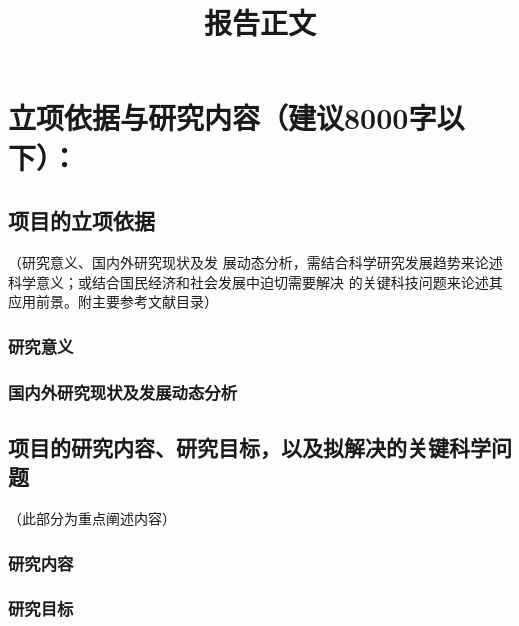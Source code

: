 \documentclass[a4paper,12pt, AutoFakeBold, fontset=adobe]{ctexart}
\title{\bfseries\kaishu\zihao{3} 报告正文}
\author{\vspace{-2cm}}
\date{\vspace{-2cm}}
\begin{document}
\maketitle

\section{立项依据与研究内容（建议8000字以下）：}

\subsection{项目的立项依据}{\color{nsfcblue}\kaishu\noindent（研究意义、国内外研究现状及发
  展动态分析，需结合科学研究发展趋势来论述科学意义；或结合国民经济和社会发展中迫切需要解决
  的关键科技问题来论述其应用前景。附主要参考文献目录）}



\subsubsection{研究意义}

\subsubsection{国内外研究现状及发展动态分析}

\renewcommand\refname{\subsubsection{主要参考文献}}
\begin{spacing}{0.9}


\end{spacing}


\subsection{项目的研究内容、研究目标，以及拟解决的关键科学问题}{\color{nsfcblue}\kaishu\noindent（此部分为重点阐述内容）}

\subsubsection{研究内容}


\subsubsection{研究目标}
\end{document}
